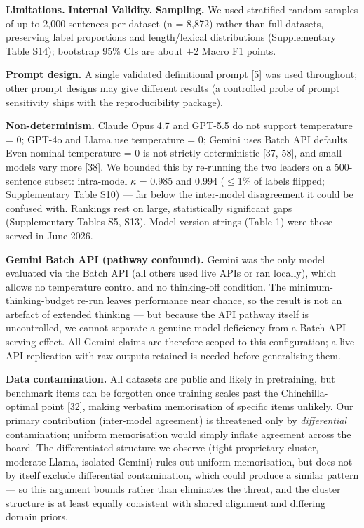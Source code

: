 \documentclass[11pt]{article}
\begin{document}
\textbf{Limitations.} \textbf{Internal Validity.} \textbf{Sampling.} We
used stratified random samples of up to 2,000 sentences per dataset (n =
8,872) rather than full datasets, preserving label proportions and
length/lexical distributions (Supplementary Table S14); bootstrap 95\%
CIs are about $\pm$2 Macro F1 points.

\textbf{Prompt design.} A single validated definitional prompt {[}5{]}
was used throughout; other prompt designs may give different results (a
controlled probe of prompt sensitivity ships with the reproducibility
package).

\textbf{Non-determinism.} Claude Opus 4.7 and GPT-5.5 do not support
temperature = 0; GPT-4o and Llama use temperature = 0; Gemini uses Batch
API defaults. Even nominal temperature = 0 is not strictly deterministic
{[}37, 58{]}, and small models vary more {[}38{]}. We bounded this by
re-running the two leaders on a 500-sentence subset: intra-model $\kappa$ =
0.985 and 0.994 ($\leq$1\% of labels flipped; Supplementary Table S10) ---
far below the inter-model disagreement it could be confused with.
Rankings rest on large, statistically significant gaps (Supplementary
Tables S5, S13). Model version strings (Table 1) were those served in
June 2026.

\textbf{Gemini Batch API (pathway confound).} Gemini was the only model
evaluated via the Batch API (all others used live APIs or ran locally),
which allows no temperature control and no thinking-off condition. The
minimum-thinking-budget re-run leaves performance near chance, so the
result is not an artefact of extended thinking --- but because the API
pathway itself is uncontrolled, we cannot separate a genuine model
deficiency from a Batch-API serving effect. All Gemini claims are
therefore scoped to this configuration; a live-API replication with raw
outputs retained is needed before generalising them.

\textbf{Data contamination.} All datasets are public and likely in
pretraining, but benchmark items can be forgotten once training scales
past the Chinchilla-optimal point {[}32{]}, making verbatim memorisation
of specific items unlikely. Our primary contribution (inter-model
agreement) is threatened only by \emph{differential} contamination;
uniform memorisation would simply inflate agreement across the board.
The differentiated structure we observe (tight proprietary cluster,
moderate Llama, isolated Gemini) rules out uniform memorisation, but
does not by itself exclude differential contamination, which could
produce a similar pattern --- so this argument bounds rather than
eliminates the threat, and the cluster structure is at least equally
consistent with shared alignment and differing domain priors.
\end{document}
